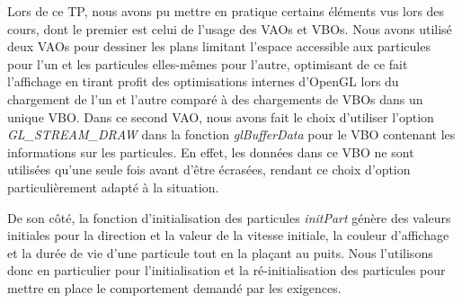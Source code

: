 Lors de ce TP, nous avons pu mettre en pratique certains éléments vus lors des cours, dont le premier est celui de l'usage des VAOs et VBOs.
Nous avons utilisé deux VAOs pour dessiner les plans limitant l'espace accessible aux particules pour l'un et les particules elles-mêmes pour l'autre, optimisant de ce fait l'affichage en tirant profit des optimisations internes d'OpenGL lors du chargement de l'un et l'autre comparé à des chargements de VBOs dans un unique VBO.
Dans ce second VAO, nous avons fait le choix d'utiliser l'option \textit{GL\_STREAM\_DRAW} dans la fonction \textit{glBufferData} pour le VBO contenant les informations sur les particules.
En effet, les données dans ce VBO ne sont utilisées qu'une seule fois avant d'être écrasées, rendant ce choix d'option particulièrement adapté à la situation.

De son côté, la fonction d'initialisation des particules \textit{initPart} génère des valeurs initiales pour la direction et la valeur de la vitesse initiale, la couleur d'affichage et la durée de vie d'une particule tout en la plaçant au puits.
Nous l'utilisons donc en particulier pour l'initialisation et la ré-initialisation des particules pour mettre en place le comportement demandé par les exigences.

